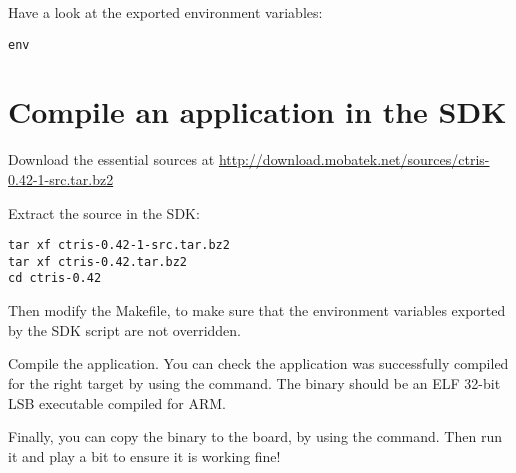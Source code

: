 Have a look at the exported environment variables:
\begin{verbatim}
env
\end{verbatim}

\section{Compile an application in the SDK}

Download the essential  sources at
\url{http://download.mobatek.net/sources/ctris-0.42-1-src.tar.bz2}

Extract the source in the SDK:
\begin{verbatim}
tar xf ctris-0.42-1-src.tar.bz2
tar xf ctris-0.42.tar.bz2
cd ctris-0.42
\end{verbatim}

Then modify the Makefile, to make sure that the environment variables exported
by the SDK script are not overridden.

Compile the application. You can check the application was
successfully compiled for the right target by using the  command.
The  binary should be an ELF 32-bit LSB executable
compiled for ARM.

Finally, you can copy the binary to the board, by using the 
command. Then run it and play a bit to ensure it is working fine!
